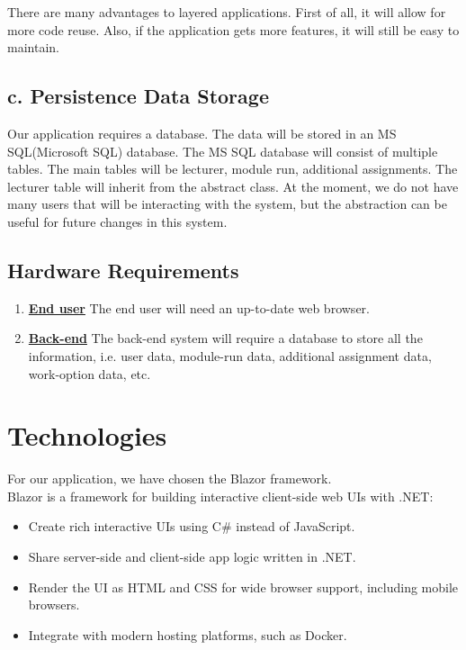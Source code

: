 \documentclass{scrartcl}
\begin{document}
There are many advantages to  layered applications. First of all, it will allow for more code reuse. Also, if the application gets more features, it will still be easy to maintain. 



\subsection{c. Persistence Data Storage }
Our application requires a database. The data will be stored in an MS SQL(Microsoft SQL) database.
The MS SQL database will consist of multiple tables. The main tables will be lecturer, module run, additional assignments. The lecturer table will inherit from the abstract class. At the moment, we do not have many users that will be interacting with the system, but the abstraction can be useful for future changes in this system.



\subsection{Hardware Requirements}
\begin{enumerate}
\item \textbf{\underline{End user}}
The end user will need an up-to-date web browser. 
\item
\textbf{\underline{Back-end}}
The back-end system will require a database to store all the information, i.e. user data, module-run data, additional assignment data, work-option data, etc.
\end{enumerate}




\section{Technologies}



For our application, we have chosen the Blazor framework.\\
Blazor is a framework for building interactive client-side web UIs with .NET:\cite{microsoft-blazor}

\begin{itemize}

\item Create rich interactive UIs using C\# instead of JavaScript.
\item Share server-side and client-side app logic  written in .NET.
\item Render the UI as HTML and CSS for wide browser support, including mobile browsers.
\item Integrate with modern hosting platforms, such as Docker.

\end{itemize}
\end{document}
